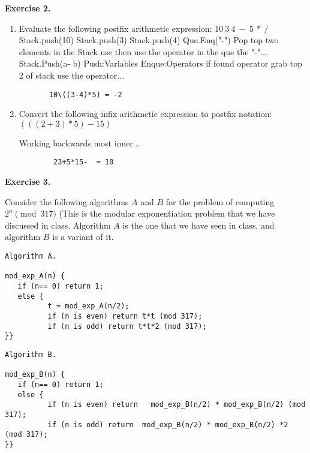 \documentclass[11pt]{article}
\begin{document}
\bigskip

\textbf{Exercise 2.}  
\begin{enumerate}
\item Evaluate the following postfix arithmetic expression:  $10~3~4~-~5~*~/$
    \newline\newline Stack.push(10) Stack.push(3) Stack.push(4)
    \newline Que.Enq("-")
    \newline Pop top two elements in the Stack use then use the operator in the que the "-"...
    \newline Stack.Push(a- b)
    \newline Push:Variables Enque:Operators
    \newline if found operator grab top 2 of stack use the operator... 

    \begin{verbatim}
       10\((3-4)*5) = -2
    \end{verbatim}

\item Convert the following infix arithmetic expression to postfix notation: $(((2+3)*5)-15)$

    Working backwards most inner...
    \begin{verbatim}
        23+5*15-  = 10
    \end{verbatim}

\end{enumerate}

\bigskip

\textbf{Exercise 3.}

Consider the following algorithms $A$ and $B$ for the problem of computing $2^n \pmod{ 317}$ (This is the modular exponentiation problem that we  have discussed in class. Algorithm $A$ is the one that we have seen in class, and algorithm $B$ is a variant of it.

\begin{verbatim}
Algorithm A.

mod_exp_A(n) {
   if (n== 0) return 1;
   else {
          t = mod_exp_A(n/2);  
          if (n is even) return t*t (mod 317);
          if (n is odd) return t*t*2 (mod 317);
}}
\end{verbatim}


\begin{verbatim}
Algorithm B.

mod_exp_B(n) {
   if (n== 0) return 1;
   else {
          if (n is even) return   mod_exp_B(n/2) * mod_exp_B(n/2) (mod 317);
          if (n is odd) return  mod_exp_B(n/2) * mod_exp_B(n/2) *2 (mod 317);
}}
\end{verbatim}
\end{document}

